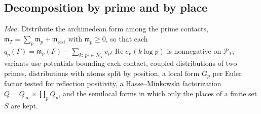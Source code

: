 \documentclass[11pt]{amsart}
\theoremstyle{definition}
\theoremstyle{remark}
\numberwithin{equation}{section}
\DeclareMathOperator{\Rel}{Re}
\newcommand{\cF}{c_F}                                  %
\newcommand{\PT}{\mathcal{P}_T}                        %
\newcommand{\NT}{\mathcal{N}_T}                        %
\newcommand{\mT}{\mathfrak{m}_T}                       %
\newcommand{\entry}[1]{\par\smallskip\noindent\textit{#1.}\enspace}
\begin{document}
\subsection{Decomposition by prime and by place}\label{w4:fam:R3}

\entry{Idea} Distribute the archimedean form among the prime contacts, $\mT=\sum_{p}\mathfrak m_p+\mathfrak m_{\mathrm{rest}}$ with
$\mathfrak m_p\ge0$, so that each $q_p(F)=\mathfrak m_p(F)-\sum_{k:\,p^k\in\NT}v_{p^k}\Rel\cF(k\log p)$ is nonnegative on $\PT$; variants
use potentials bounding each contact, coupled distributions of two primes, distributions with atoms split by position, a local form
$G_p$ per Euler factor tested for reflection positivity, a Hasse--Minkowski factorization $Q=Q_\infty\times\prod_pQ_p$, and the
semilocal forms in which only the places of a finite set $S$ are kept.
\end{document}
